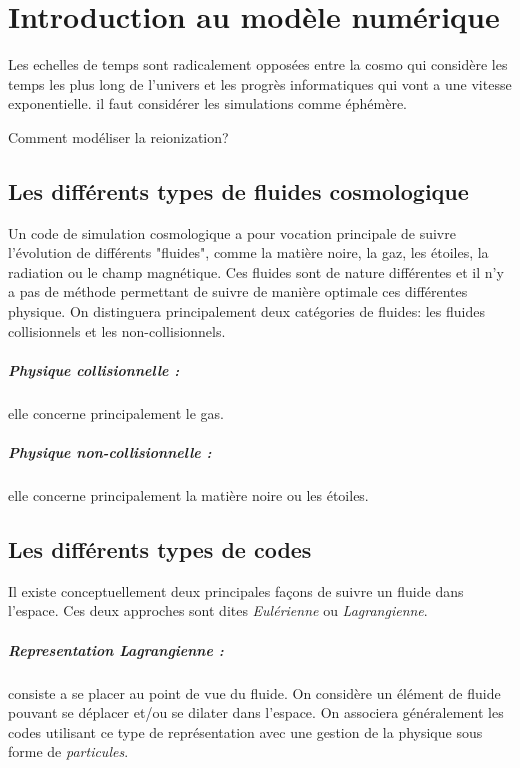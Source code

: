 \chapter{Introduction au modèle numérique}\label{ch:introduction}

Les echelles de temps sont radicalement opposées entre la cosmo qui considère les temps les plus long de l'univers et les progrès informatiques qui vont a une vitesse exponentielle. 
il faut considérer les simulations comme éphémère.

Comment modéliser la reionization?

\section{Les différents types de fluides cosmologique}

Un code de simulation cosmologique a pour vocation principale de suivre l'évolution de différents "fluides", comme la matière noire, la gaz, les étoiles, la radiation ou le champ magnétique.
Ces fluides sont de nature différentes et il n'y a pas de méthode permettant de suivre de manière optimale ces différentes physique.
On distinguera principalement deux catégories de fluides: les fluides collisionnels et les non-collisionnels.

\paragraph{Physique collisionnelle : } elle concerne principalement le gas.

\paragraph{Physique non-collisionnelle : } elle concerne principalement la matière noire ou les étoiles.



\section{Les différents types de codes}

Il existe conceptuellement deux principales façons de suivre un fluide dans l'espace.
Ces deux approches sont dites \emph{Eulérienne} ou \emph{Lagrangienne}.

\paragraph{Representation Lagrangienne : } 
consiste a se placer au point de vue du fluide.
On considère un élément de fluide pouvant se déplacer et/ou se dilater dans l'espace.
On associera généralement les codes utilisant ce type de représentation avec une gestion de la physique sous forme de \emph{particules}.

